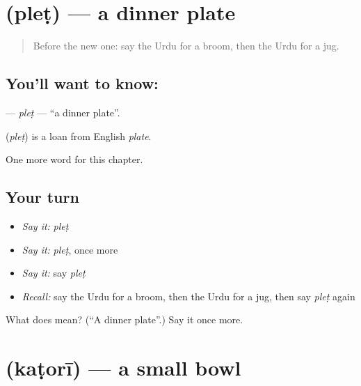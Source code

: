 \section[\texorpdfstring{\ur{پلیٹ} (pleṭ)}{پلیٹ (pleṭ)}]{ (pleṭ) — a dinner plate}

\label{lesson:UR-C224-plet}



\begin{quote}
Before the new one: say the Urdu for a broom, then the Urdu for a jug.
\end{quote}

\subsection*{You'll want to know: }
\textbf{} — \emph{pleṭ} — \textquotedblleft{}a dinner plate\textquotedblright{}.

\begin{cousinweb}
\textbf{} (\emph{pleṭ}) is a loan from English \emph{plate}.
\end{cousinweb}

\begin{grammarlens}[title={What you've built}]
One more word for this chapter.
\end{grammarlens}

\subsection*{Your turn}
\begin{itemize}
\raggedright
  \item \emph{Say it:} \emph{pleṭ}
  \item \emph{Say it:} \emph{pleṭ}, once more
  \item \emph{Say it:} say \emph{pleṭ}
  \item \emph{Recall:} say the Urdu for a broom, then the Urdu for a jug, then say \emph{pleṭ} again
\end{itemize}

\begin{tcolorbox}[breakable,colback=teal!4,colframe=teal!35!black,title={Before you move on}]
What does  mean? (\textquotedblleft{}A dinner plate\textquotedblright{}.) Say it once more.
\end{tcolorbox}
\section[\texorpdfstring{\ur{کٹوری} (kaṭorī)}{کٹوری (kaṭorī)}]{ (kaṭorī) — a small bowl}

